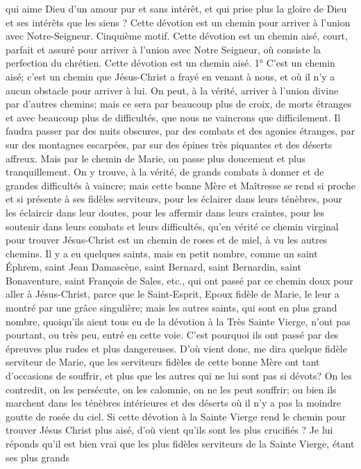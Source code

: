 qui aime Dieu d'un amour pur et sans intérêt, et qui prise plus la gloire de Dieu et ses intérêts que les siens ?
Cette dévotion est un chemin pour arriver
à l'union avec Notre-Seigneur.
 Cinquième motif. Cette dévotion est un chemin aisé, court, parfait et assuré pour arriver à l'union avec Notre Seigneur, où consiste la perfection du chrétien.
Cette dévotion est un chemin aisé.
1° C'est un chemin aisé; c'est un chemin que Jésus-Christ a frayé en venant à nous, et où il n'y a aucun obstacle
pour arriver à lui. On peut, à la vérité, arriver à l'union divine par d'autres chemins; mais ce sera par beaucoup plus
de croix, de morts étranges et avec beaucoup plus de difficultés, que nous ne vaincrons que difficilement. Il faudra
passer par des nuits obscures, par des combats et des agonies étranges, par sur des montagnes escarpées, par
sur des épines très piquantes et des déserts affreux. Mais par le chemin de Marie, on passe plus doucement et
plus tranquillement.
On y trouve, à la vérité, de grands combats à donner et de grandes difficultés à vaincre; mais cette bonne Mère et
Maîtresse se rend si proche et si présente à ses fidèles serviteurs, pour les éclairer dans leurs ténèbres, pour les
éclaircir dans leur doutes, pour les affermir dans leurs craintes, pour les soutenir dans leurs combats et leurs
difficultés, qu'en vérité ce chemin virginal pour trouver Jésus-Christ est un chemin de roses et de miel, à vu les
autres chemins. Il y a eu quelques saints, mais en petit nombre, comme un saint Éphrem, saint Jean Damascène,
saint Bernard, saint Bernardin, saint Bonaventure, saint François de Sales, etc., qui ont passé par ce chemin doux
pour aller à Jésus-Christ, parce que le Saint-Esprit, Epoux fidèle de Marie, le leur a montré par une grâce
singulière; mais les autres saints, qui sont en plus grand nombre, quoiqu'ils aient tous eu de la dévotion à la Très
Sainte Vierge, n'ont pas pourtant, ou très peu, entré en cette voie. C'est pourquoi ils ont passé par des épreuves
plus rudes et plus dangereuses.
 D'où vient donc, me dira quelque fidèle serviteur de Marie, que les serviteurs fidèles de cette bonne Mère ont
tant d'occasions de souffrir, et plus que les autres qui ne lui sont pas si dévots? On les contredit, on les persécute,
on les calomnie, on ne les peut souffrir; ou bien ils marchent dans les ténèbres intérieures et des déserts où il n'y a
pas la moindre goutte de rosée du ciel. Si cette dévotion à la Sainte Vierge rend le chemin pour trouver Jésus Christ plus aisé, d'où vient qu'ils sont les plus crucifiés ?
 Je lui réponds qu'il est bien vrai que les plus fidèles serviteurs de la Sainte Vierge, étant ses plus grands
